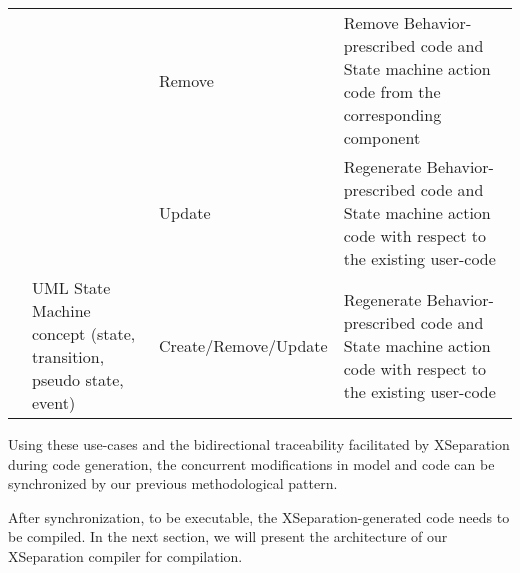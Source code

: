\begin{table*}[]
\begin{tabular}{|l|p{3cm}|l|p{9.5cm}|}
		&                                                                    & Remove                           & Remove Behavior-prescribed code and State machine action code from the corresponding component           \\ \cline{3-4} 
		&                                                                    & Update                           & Regenerate Behavior-prescribed code and State machine action code with respect to the existing user-code \\ \cline{2-4} 
		& UML State Machine concept (state, transition, pseudo state, event) & Create/Remove/Update             & Regenerate Behavior-prescribed code and State machine action code with respect to the existing user-code \\ \hline
	\end{tabular}
\end{table*}

Using these use-cases and the bidirectional traceability facilitated by XSeparation during code generation, the concurrent modifications in model and code can be synchronized by our previous methodological pattern.

After synchronization, to be executable, the XSeparation-generated code needs to be compiled.
In the next section, we will present the architecture of our XSeparation compiler for compilation. 

%

%
%
